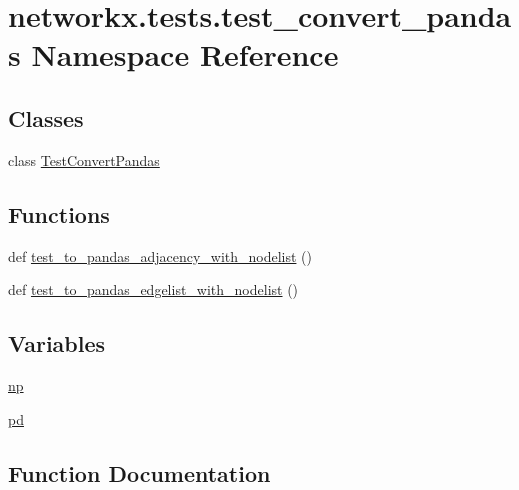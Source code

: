 \hypertarget{namespacenetworkx_1_1tests_1_1test__convert__pandas}{}\section{networkx.\+tests.\+test\+\_\+convert\+\_\+pandas Namespace Reference}
\label{namespacenetworkx_1_1tests_1_1test__convert__pandas}
\subsection*{Classes}
\begin{DoxyCompactItemize}
\item 
class \hyperlink{classnetworkx_1_1tests_1_1test__convert__pandas_1_1TestConvertPandas}{Test\+Convert\+Pandas}
\end{DoxyCompactItemize}
\subsection*{Functions}
\begin{DoxyCompactItemize}
\item 
def \hyperlink{namespacenetworkx_1_1tests_1_1test__convert__pandas_a0775f7e04ed50d84eb6366da8aa630a4}{test\+\_\+to\+\_\+pandas\+\_\+adjacency\+\_\+with\+\_\+nodelist} ()
\item 
def \hyperlink{namespacenetworkx_1_1tests_1_1test__convert__pandas_a14ce735440f54994f59b4ad49727486c}{test\+\_\+to\+\_\+pandas\+\_\+edgelist\+\_\+with\+\_\+nodelist} ()
\end{DoxyCompactItemize}
\subsection*{Variables}
\begin{DoxyCompactItemize}
\item 
\hyperlink{namespacenetworkx_1_1tests_1_1test__convert__pandas_a593c78df903f8641a4d90f2056a2aac4}{np}
\item 
\hyperlink{namespacenetworkx_1_1tests_1_1test__convert__pandas_ad4329eed7d0d02214792bbe0560280d2}{pd}
\end{DoxyCompactItemize}


\subsection{Function Documentation}
\mbox{\label{namespacenetworkx_1_1tests_1_1test__convert__pandas_a0775f7e04ed50d84eb6366da8aa630a4}} 
